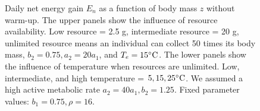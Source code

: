 \begin{figure}[H]
\begin{center}
\caption{
      Daily net energy gain  $E_n$ as a function of body mass $z$ without warm-up.
	The upper panels show the influence of resource availability.
	Low resource = 2.5 g, intermediate resource = 20 g, unlimited resource means an individual can collect 50 times its body mass, $b_2 = 0.75, a_2 = 20 a_1$, and $T_e = 15 ^{\circ} \rm{C}$. 
	The lower panels show the influence of temperature when resources are unlimited.
	Low, intermediate, and high temperature = $5, 15, 25 ^{\circ} \rm{C}$.
	We assumed a high active metabolic rate $a_2 = 40 a_1, b_2  = 1.25$.
	Fixed parameter values: $b_1 = 0.75, \rho = 16$.
}
\label{fig2}
\end{center}
\end{figure}
\newpage
%

